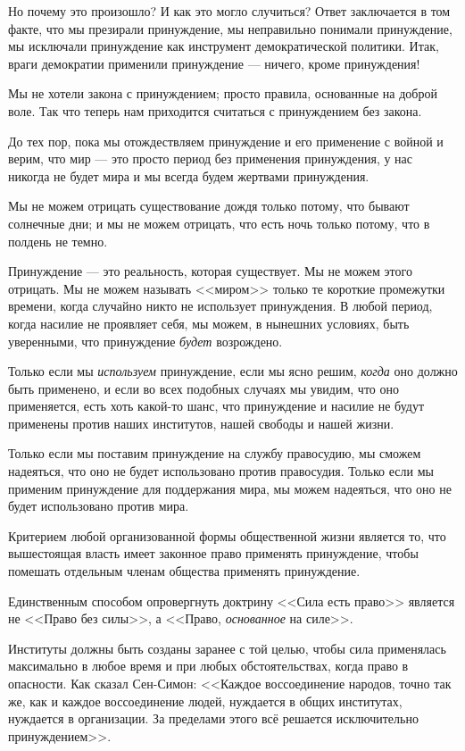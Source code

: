 Но почему это произошло? И как это могло случиться? Ответ заключается в том факте, что мы презирали принуждение, мы неправильно понимали принуждение, мы исключали принуждение как инструмент демократической политики. Итак, враги демократии применили принуждение — ничего, кроме принуждения!

Мы не хотели закона с принуждением; просто правила, основанные на доброй воле. Так что теперь нам приходится считаться с принуждением без закона.

До тех пор, пока мы отождествляем принуждение и его применение с войной и верим, что мир — это просто период без применения принуждения, у нас никогда не будет мира и мы всегда будем жертвами принуждения.

Мы не можем отрицать существование дождя только потому, что бывают солнечные дни; и мы не можем отрицать, что есть ночь только потому, что в полдень не темно.

Принуждение — это реальность, которая существует. Мы не можем этого отрицать. Мы не можем называть <<миром>> только те короткие промежутки времени, когда случайно никто не использует принуждения. В любой период, когда насилие не проявляет себя, мы можем, в нынешних условиях, быть уверенными, что принуждение \textit{будет} возрождено.

Только если мы \textit{используем} принуждение, если мы ясно решим, \textit{когда} оно должно быть применено, и если во всех подобных случаях мы увидим, что оно применяется, есть хоть какой-то шанс, что принуждение и насилие не будут применены против наших институтов, нашей свободы и нашей жизни.

Только если мы поставим принуждение на службу правосудию, мы сможем надеяться, что оно не будет использовано против правосудия. Только если мы применим принуждение для поддержания мира, мы можем надеяться, что оно не будет использовано против мира.

Критерием любой организованной формы общественной жизни является то, что вышестоящая власть имеет законное право применять принуждение, чтобы помешать отдельным членам общества применять принуждение.

Единственным способом опровергнуть доктрину <<Сила есть право>> является не <<Право без силы>>, а <<Право, \textit{основанное} на силе>>.

Институты должны быть созданы заранее с той целью, чтобы сила применялась максимально в любое время и при любых обстоятельствах, когда право в опасности. Как сказал Сен-Симон: <<Каждое воссоединение народов, точно так же, как и каждое воссоединение людей, нуждается в общих институтах, нуждается в организации. За пределами этого всё решается исключительно принуждением>>.

